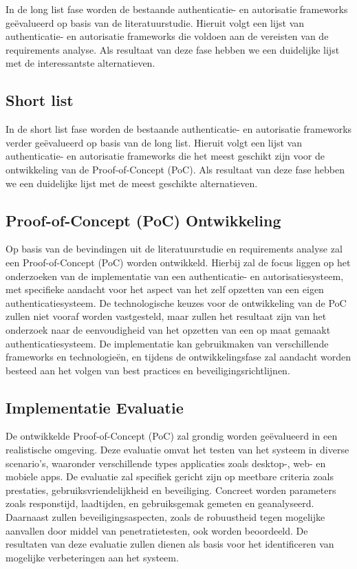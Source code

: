 In de long list fase worden de bestaande authenticatie- en autorisatie frameworks geëvalueerd op basis van de literatuurstudie. Hieruit volgt een lijst van
authenticatie- en autorisatie frameworks die voldoen aan de vereisten van de requirements analyse.
\newline
Als resultaat van deze fase hebben we een duidelijke lijst met de interessantste alternatieven.

\subsection{Short list}

In de short list fase worden de bestaande authenticatie- en autorisatie frameworks verder geëvalueerd op basis van de long list. Hieruit volgt een lijst van
authenticatie- en autorisatie frameworks die het meest geschikt zijn voor de ontwikkeling van de Proof-of-Concept (PoC).
\newline
Als resultaat van deze fase hebben we een duidelijke lijst met de meest geschikte alternatieven.

\subsection{Proof-of-Concept (PoC) Ontwikkeling}

Op basis van de bevindingen uit de literatuurstudie en requirements analyse zal een Proof-of-Concept (PoC) worden ontwikkeld. Hierbij zal de focus 
liggen op het onderzoeken van de implementatie van een authenticatie- en autorisatiesysteem, met specifieke aandacht voor het aspect van 
het zelf opzetten van een eigen authenticatiesysteem.
De technologische keuzes voor de ontwikkeling van de PoC zullen niet vooraf worden vastgesteld, maar zullen het resultaat zijn van het onderzoek 
naar de eenvoudigheid van het opzetten van een op maat gemaakt authenticatiesysteem. De implementatie kan gebruikmaken van verschillende frameworks 
en technologieën, en tijdens de ontwikkelingsfase zal aandacht worden besteed aan het volgen van best practices en beveiligingsrichtlijnen.

\subsection{Implementatie Evaluatie}

De ontwikkelde Proof-of-Concept (PoC) zal grondig worden geëvalueerd in een realistische omgeving. Deze evaluatie omvat het testen van het systeem in 
diverse scenario's, waaronder verschillende types applicaties zoals desktop-, web- en mobiele apps. De evaluatie zal specifiek gericht zijn op meetbare 
criteria zoals prestaties, gebruiksvriendelijkheid en beveiliging. Concreet worden parameters zoals responstijd, laadtijden, en gebruiksgemak gemeten en 
geanalyseerd. Daarnaast zullen beveiligingsaspecten, zoals de robuustheid tegen mogelijke aanvallen door middel van penetratietesten, ook worden beoordeeld. 
De resultaten van deze evaluatie zullen dienen als basis voor het identificeren van mogelijke verbeteringen aan het systeem.

